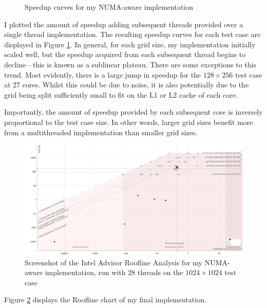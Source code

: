 \documentclass[11pt, twocolumn, a4paper]{article}
\begin{document}
\begin{figure}[htpb]
  \caption{Speedup curves for my NUMA-aware implementation}\label{fig:scaling}
\end{figure}

I plotted the amount of speedup adding subsequent threads provided over a single thread implementation.
The resulting speedup curves for each test case are displayed in Figure \ref{fig:scaling}.
In general, for each grid size, my implementation initially scaled well, but the speedup acquired from each subsequent thread begins to decline---this is known as a sublinear plateau.
There are some exceptions to this trend.
Most evidently, there is a large jump in speedup for the $128\times256$ test case at 27 cores.
Whilst this could be due to noise, it is also potentially due to the grid being split sufficiently small to fit on the L1 or L2 cache of each core.

Importantly, the amount of speedup provided by each subsequent core is inversely proportional to the test case size.
In other words, larger grid sizes benefit more from a multithreaded implementation than smaller grid sizes.

\begin{figure}[htbp]
  \includegraphics[width=\linewidth]{roofline_numa.png}
  \caption{Screenshot of the Intel Advisor Roofline Analysis for my NUMA-aware implementation, run with 28 threads on the $1024\times1024$ test case}\label{fig:roofline_numa}
\end{figure}

Figure \ref{fig:roofline_numa} displays the Roofline chart of my final implementation.

\clearpage

\onecolumn{
  \printbibliography
}
\end{document}
